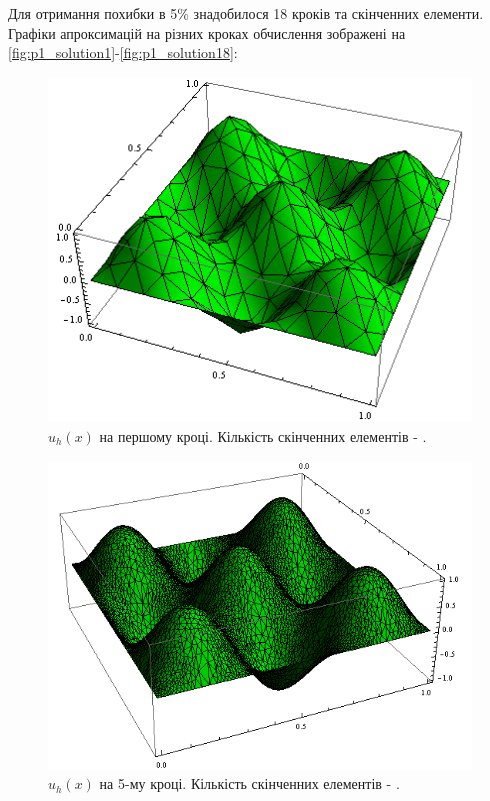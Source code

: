 Для отримання похибки в 5\% знадобилося 18 кроків та  скінченних елементи. Графіки апроксимацій на різних кроках обчислення зображені на \autoref{fig:p1_solution1}-\ref{fig:p1_solution18}:
%
\begin{figure}[H]
	\centering
    \includegraphics[scale=0.9]{problem1/my/solutions/1}
    \caption{$u_h(x)$ на першому кроці. Кількість скінченних елементів - .}
    \label{fig:p1_solution1}
\end{figure}
%
\begin{figure}[H]
	\centering
    \includegraphics[scale=0.7]{problem1/my/solutions/5}
    \caption{$u_h(x)$ на 5-му кроці. Кількість скінченних елементів - .}
    \label{fig:p1_solution5}
\end{figure}
%
